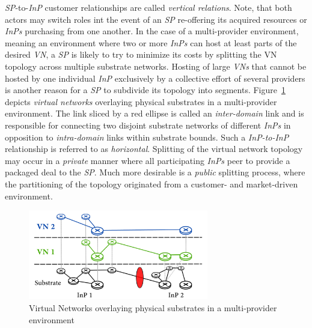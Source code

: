 \documentclass[prodmode,acmtomccap]{acmlarge}
\begin{document}
\emph{SP}-to-\emph{InP} customer relationships are called \emph{vertical relations}. Note, that both actors may switch roles int the event of an 
\emph{SP} re-offering its acquired resources or \emph{InPs} purchasing from one another.
 In the case of a multi-provider environment, meaning an environment where two or more
\emph{InPs} can host at least parts of the desired \emph{VN}, a \emph{SP} is likely to try to minimize its costs by splitting the VN topology across multiple substrate networks.
Hosting of large \emph{VNs} that cannot be hosted by one individual \emph{InP} exclusively by a collective effort of several providers is another reason for a \emph{SP}
to subdivide its topology into segments. Figure~\ref{fig1} depicts \emph{virtual networks} overlaying physical substrates in a multi-provider environment.
The link sliced by a red ellipse is called an \emph{inter-domain} link and is responsible for connecting two disjoint substrate networks of different \emph{InPs} in opposition to 
\emph{intra-domain} links within substrate bounds. Such a \emph{InP-to-InP} relationship is referred to as \emph{horizontal}. 
Splitting of the virtual network topology may occur in a \emph{private} manner where all participating \emph{InPs} peer
to provide a packaged deal to the \emph{SP}. Much more desirable is a \emph{public} splitting process, where the partitioning of the topology originated from a customer- and
market-driven environment.

\begin{figure}[htb]
	\centering
	\includegraphics[width=0.7\textwidth]{virtualnetworks}
	\caption{Virtual Networks overlaying physical substrates in a multi-provider environment}
	\label{fig1}
\end{figure}
\end{document}
